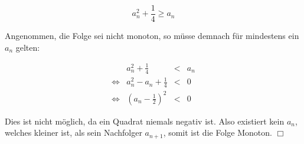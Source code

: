 \documentclass [a4paper,11pt]{article}
\begin{document}
\begin {enumerate}
			$$a_n^2 + \frac{1}{4} \geq a_n$$

			Angenommen, die Folge sei nicht monoton, so müsse demnach für mindestens
			ein $a_n$ gelten:

			$$\begin{array}{lrcl}
							& a_n^2 + \frac{1}{4} &<& a_n \\[2pt]
			\Leftrightarrow & a_n^2 - a_n + \frac{1}{4} &<& 0 \\[2pt]
			\Leftrightarrow & (a_n - \frac{1}{2})^2 &<& 0
			\end{array}$$

			Dies ist nicht möglich, da ein Quadrat niemals negativ ist. Also existiert
			kein $a_n$, welches kleiner ist, als sein Nachfolger $a_{n+1}$, somit
			ist die Folge Monoton. $\Box$

	\end {enumerate}
\end{document}
